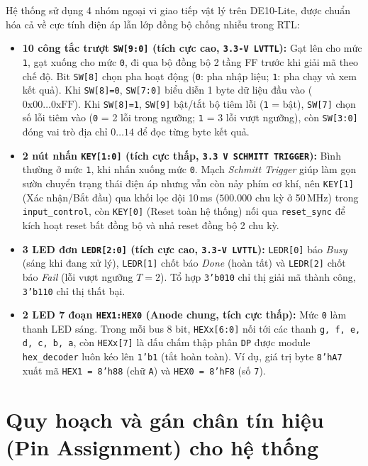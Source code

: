 Hệ thống sử dụng 4 nhóm ngoại vi giao tiếp vật lý trên DE10-Lite, được chuẩn hóa cả về cực tính điện áp lẫn lớp đồng bộ chống nhiễu trong RTL:
\begin{itemize}
    \item \textbf{10 công tắc trượt \texttt{SW[9:0]} (tích cực cao, \texttt{3.3-V LVTTL}):} Gạt lên cho mức \texttt{1}, gạt xuống cho mức \texttt{0}, đi qua bộ đồng bộ 2 tầng FF trước khi giải mã theo chế độ. Bit \texttt{SW[8]} chọn pha hoạt động (\texttt{0}: pha nhập liệu; \texttt{1}: pha chạy và xem kết quả). Khi \texttt{SW[8]=0}, \texttt{SW[7:0]} biểu diễn 1 byte dữ liệu đầu vào ($0\text{x00}\dots 0\text{xFF}$). Khi \texttt{SW[8]=1}, \texttt{SW[9]} bật/tắt bộ tiêm lỗi (\texttt{1} = bật), \texttt{SW[7]} chọn số lỗi tiêm vào (\texttt{0} = 2 lỗi trong ngưỡng; \texttt{1} = 3 lỗi vượt ngưỡng), còn \texttt{SW[3:0]} đóng vai trò địa chỉ $0\dots 14$ để đọc từng byte kết quả.
    \item \textbf{2 nút nhấn \texttt{KEY[1:0]} (tích cực thấp, \texttt{3.3 V SCHMITT TRIGGER}):} Bình thường ở mức \texttt{1}, khi nhấn xuống mức \texttt{0}. Mạch \textit{Schmitt Trigger} giúp làm gọn sườn chuyển trạng thái điện áp nhưng vẫn còn nảy phím cơ khí, nên \texttt{KEY[1]} (Xác nhận/Bắt đầu) qua khối lọc dội 10\,ms ($500.000$ chu kỳ ở 50\,MHz) trong \texttt{input\_control}, còn \texttt{KEY[0]} (Reset toàn hệ thống) nối qua \texttt{reset\_sync} để kích hoạt reset bất đồng bộ và nhả reset đồng bộ 2 chu kỳ.
    \item \textbf{3 LED đơn \texttt{LEDR[2:0]} (tích cực cao, \texttt{3.3-V LVTTL}):} \texttt{LEDR[0]} báo \textit{Busy} (sáng khi đang xử lý), \texttt{LEDR[1]} chốt báo \textit{Done} (hoàn tất) và \texttt{LEDR[2]} chốt báo \textit{Fail} (lỗi vượt ngưỡng $T=2$). Tổ hợp \texttt{3'b010} chỉ thị giải mã thành công, \texttt{3'b110} chỉ thị thất bại.
    \item \textbf{2 LED 7 đoạn \texttt{HEX1:HEX0} (Anode chung, tích cực thấp):} Mức \texttt{0} làm thanh LED sáng. Trong mỗi bus 8 bit, \texttt{HEXx[6:0]} nối tới các thanh \texttt{g, f, e, d, c, b, a}, còn \texttt{HEXx[7]} là dấu chấm thập phân \texttt{DP} được module \texttt{hex\_decoder} luôn kéo lên \texttt{1'b1} (tắt hoàn toàn). Ví dụ, giá trị byte \texttt{8'hA7} xuất mã \texttt{HEX1 = 8'h88} (chữ \texttt{A}) và \texttt{HEX0 = 8'hF8} (số \texttt{7}).
\end{itemize}

\section{Quy hoạch và gán chân tín hiệu (Pin Assignment) cho hệ thống}
\label{sec:pin-assignment}

